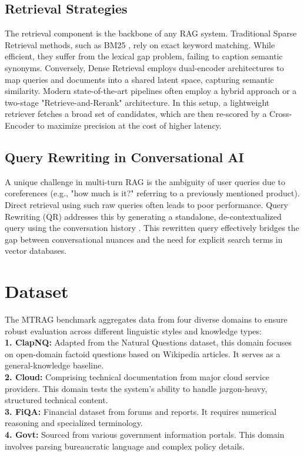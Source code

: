 \documentclass[11pt]{article}
\begin{document}
\subsection{Retrieval Strategies}
The retrieval component is the backbone of any RAG system. Traditional Sparse Retrieval methods, such as BM25 \citet{Robertson2009}, rely on exact keyword matching. While efficient, they suffer from the lexical gap problem, failing to caption semantic synonyms. Conversely, Dense Retrieval \citet{karpukhin2020dense} employs dual-encoder architectures to map queries and documents into a shared latent space, capturing semantic similarity. Modern state-of-the-art pipelines often employ a hybrid approach or a two-stage "Retrieve-and-Rerank" architecture. In this setup, a lightweight retriever fetches a broad set of candidates, which are then re-scored by a Cross-Encoder \citet{nogueira2019} to maximize precision at the cost of higher latency.

\subsection{Query Rewriting in Conversational AI}
A unique challenge in multi-turn RAG is the ambiguity of user queries due to coreferences (e.g., "how much is it?" referring to a previously mentioned product). Direct retrieval using such raw queries often leads to poor performance. Query Rewriting (QR) addresses this by generating a standalone, de-contextualized query using the conversation history \citet{vakulenko2021qr}. This rewritten query effectively bridges the gap between conversational nuances and the need for explicit search terms in vector databases.

\section{Dataset}
The MTRAG benchmark aggregates data from four diverse domains to ensure robust evaluation across different linguistic styles and knowledge types: \\
    \textbf{1. ClapNQ:} Adapted from the Natural Questions dataset, this domain focuses on open-domain factoid questions based on Wikipedia articles. It serves as a general-knowledge baseline. \\
    \textbf{2. Cloud:} Comprising technical documentation from major cloud service providers. This domain tests the system's ability to handle jargon-heavy, structured technical content. \\
    \textbf{3. FiQA:} Financial dataset from forums and reports. It requires numerical reasoning and specialized terminology. \\
    \textbf{4. Govt:} Sourced from various government information portals. This domain involves parsing bureaucratic language and complex policy details.
\end{document}

